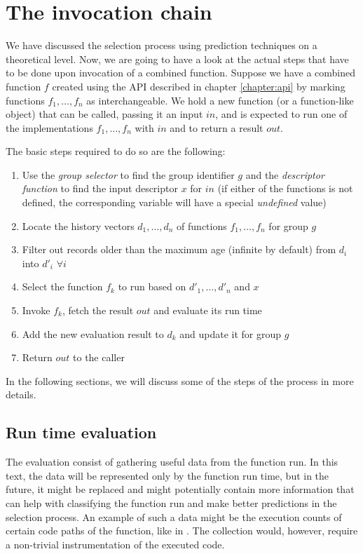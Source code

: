 \section{The invocation chain}
\label{sec:selection_and_invocation_process}

We have discussed the selection process using prediction techniques on a theoretical level. Now, we are going to have a look at the actual steps that have to be done upon invocation of a combined function. Suppose we have a combined function $f$ created using the API described in chapter \ref{chapter:api} by marking functions $f_1,\dots,f_n$ as interchangeable. We hold a new function (or a function-like object) that can be called, passing it an input $in$, and is expected to run one of the implementations $f_1,\dots,f_n$ with $in$ and to return a result $out$.

The basic steps required to do so are the following:

\begin{enumerate}
	\item Use the \textit{group selector} to find the group identifier $g$ and the \textit{descriptor function} to find the input descriptor $x$ for $in$ (if either of the functions is not defined, the corresponding variable will have a special \textit{undefined} value)
	\item Locate the history vectors $d_1,\dots,d_n$ of functions $f_1,\dots,f_n$ for group $g$
	\item Filter out records older than the maximum age (infinite by default) from $d_i$ into $d'_i$ $\forall i$
	\item Select the function $f_k$ to run based on $d'_1,\dots,d'_n$ and $x$
	\item Invoke $f_k$, fetch the result $out$ and evaluate its run time
	\item Add the new evaluation result to $d_k$ and update it for group $g$
	\item Return $out$ to the caller
\end{enumerate}

In the following sections, we will discuss some of the steps of the process in more details.

\subsection{Run time evaluation}

The evaluation consist of gathering useful data from the function run. In this text, the data will be represented only by the function run time, but in the future, it might be replaced and might potentially contain more information that can help with classifying the function run and make better predictions in the selection process. An example of such a data might be the execution counts of certain code paths of the function, like in \cite{chun_mantis:_2010}. The collection would, however, require a non-trivial instrumentation of the executed code.

